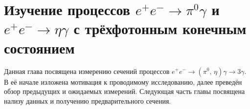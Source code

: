 \section{Изучение процессов \texorpdfstring{$e^+ e^- \to \pi^0 \gamma$}{e+ e- --> pi0 gamma} и \texorpdfstring{$e^+ e^- \to \eta \gamma$}{e+ e- --> eta gamma} с трёхфотонным конечным состоянием}


Данная глава посвящена измерению сечений процессов $e^+ e^- \to ( \pi^0, \, \eta ) \gamma \to 3 \gamma$.
В её начале изложена мотивация к проводимому исследованию,
далее преведён обзор предыдущих и ожидаемых измерений.
Следующая часть главы посвящена нализу данных и получению предварительного сечения.











% 
